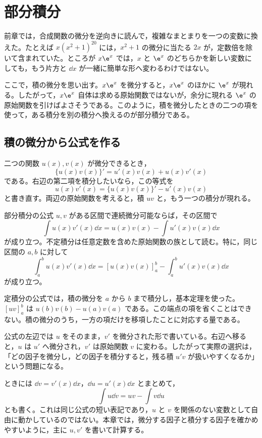 \chapter{部分積分}\label{章:部分積分}

前章では，合成関数の微分を逆向きに読んで，複雑なまとまりを一つの変数に換えた。たとえば $x(x^2+1)^{20}$ には，$x^2+1$ の微分に当たる $2x$ が，定数倍を除いて含まれていた。ところが $x\e^x$ では，$x$ と $\e^x$ のどちらかを新しい変数にしても，もう片方と $\dd x$ が一緒に簡単な形へ変わるわけではない。

ここで，積の微分を思い出す。$x\e^x$ を微分すると，$x\e^x$ のほかに $\e^x$ が現れる。したがって，$x\e^x$ 自体は求める原始関数ではないが，余分に現れる $\e^x$ の原始関数を引けばよさそうである。このように，積を微分したときの二つの項を使って，ある積分を別の積分へ換えるのが部分積分である。

\section{積の微分から公式を作る}\label{節:部分積分の導出}

二つの関数 $u(x),v(x)$ が微分できるとき，
\[
 \{u(x)v(x)\}'=u'(x)v(x)+u(x)v'(x)
\]
である。右辺の第二項を積分したいなら，この等式を
\[
 u(x)v'(x)=\{u(x)v(x)\}'-u'(x)v(x)
\]
と書き直す。両辺の原始関数を考えると，積 $uv$ と，もう一つの積分が現れる。

\begin{theorem}{部分積分の公式}
$u,v$ がある区間で連続微分可能ならば，その区間で
\[
 \int u(x)v'(x)\dd x
 =u(x)v(x)-\int u'(x)v(x)\dd x
\]
が成り立つ。不定積分は任意定数を含めた原始関数の族として読む。特に，同じ区間の $a,b$ に対して
\[
 \int_a^b u(x)v'(x)\dd x
 =[u(x)v(x)]_a^b-\int_a^b u'(x)v(x)\dd x
\]
が成り立つ。
\end{theorem}

定積分の公式では，積の微分を $a$ から $b$ まで積分し，基本定理を使った。$[uv]_a^b$ は $u(b)v(b)-u(a)v(a)$ である。この端点の項を省くことはできない。積の微分のうち，一方の項だけを移項したことに対応する量である。

公式の左辺では $u$ をそのまま，$v'$ を微分された形で書いている。右辺へ移ると，$u$ は $u'$ へ微分され，$v'$ は原始関数 $v$ に変わる。したがって実際の選択は，「どの因子を微分し，どの因子を積分すると，残る積 $u'v$ が扱いやすくなるか」という問題になる。

ときには $\dd v=v'(x)\dd x$，$\dd u=u'(x)\dd x$ とまとめて，
\[
 \int u\dd v=uv-\int v\dd u
\]
とも書く。これは同じ公式の短い表記であり，$u$ と $v$ を関係のない変数として自由に動かしているのではない。本章では，微分する因子と積分する因子を確かめやすいように，主に $u,v'$ を書いて計算する。

